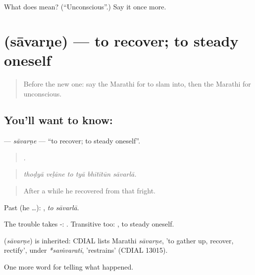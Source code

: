 \begin{tcolorbox}[breakable,colback=teal!4,colframe=teal!35!black,title={Before you move on}]
What does  mean? (\textquotedblleft{}Unconscious\textquotedblright{}.) Say it once more.
\end{tcolorbox}
\section[\texorpdfstring{\mr{सावरणे} (sāvarṇe)}{सावरणे (sāvarṇe)}]{ (sāvarṇe) — to recover; to steady oneself}

\label{lesson:MR-C296-savarne}



\begin{quote}
Before the new one: say the Marathi for to slam into, then the Marathi for unconscious.
\end{quote}

\subsection*{You'll want to know: }
\textbf{} — \emph{sāvarṇe} — \textquotedblleft{}to recover; to steady oneself\textquotedblright{}.

\begin{quote}
     .
\end{quote}

\begin{quote}
\emph{thoḍyā veḷāne to tyā bhītītūn sāvarlā.}
\end{quote}

\begin{quote}
After a while he recovered from that fright.
\end{quote}

Past (he …):  , \emph{to sāvarlā}.

The trouble takes -:  . Transitive too:  , to steady oneself.

\begin{cousinweb}
\textbf{} (\emph{sāvarṇe}) is inherited: CDIAL lists Marathi \emph{sāvarṇe}, 'to gather up, recover, rectify', under \emph{*saṁvarati}, 'restrains' (CDIAL 13015).
\end{cousinweb}

\begin{grammarlens}[title={What you've built}]
One more word for telling what happened.
\end{grammarlens}

